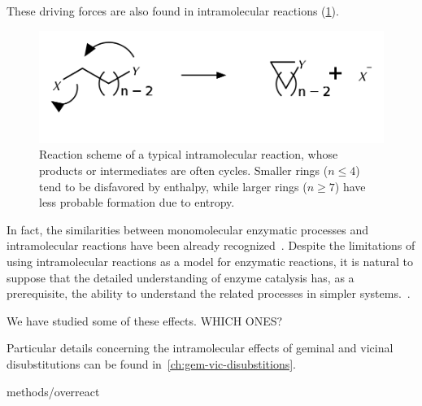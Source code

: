 These driving forces are also found in intramolecular reactions (\cref{fig:reacoes-intramoleculares}).
%
\begin{figure}[hbtp]
	\centering
	\includegraphics[width=.6\textwidth]{figures/reacao-intramolecular}
	\caption[Typical scheme of an intramolecular reactions]{
		Reaction scheme of a typical intramolecular reaction,
		whose products or
		intermediates are often cycles.
		Smaller rings ($n \le 4 $)
		tend to be disfavored by enthalpy,
		while larger rings ($n \ge 7 $)
		have less probable formation due to entropy.}%
	\label{fig:reacoes-intramoleculares}
\end{figure}
%
In fact,
the similarities between monomolecular enzymatic processes and
intramolecular reactions have been already recognized~\cite{Nilsson_1933,Bruice_1960b,Jung_1990}.
Despite the limitations of using intramolecular reactions as a model for
enzymatic reactions,
it is natural to suppose that the detailed understanding
of enzyme catalysis has,
as a prerequisite,
the ability to understand the
related processes in simpler systems.~\cite{Kirby_1972}.

We have studied some of these effects.
WHICH ONES?\@

Particular details concerning the intramolecular effects of geminal and
vicinal disubstitutions can be found in~\cref{ch:gem-vic-disubstitions}.

{methods/overreact}


